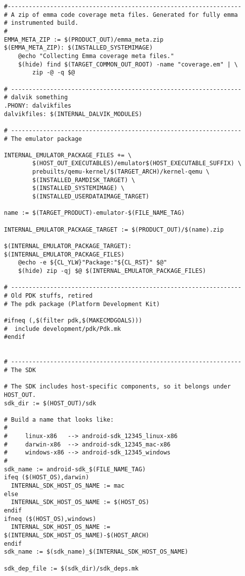 \documentclass[12pt,a4paper]{article}
\begin{document}
\begin{verbatim}
#------------------------------------------------------------------
# A zip of emma code coverage meta files. Generated for fully emma
# instrumented build.
#
EMMA_META_ZIP := $(PRODUCT_OUT)/emma_meta.zip
$(EMMA_META_ZIP): $(INSTALLED_SYSTEMIMAGE)
	@echo "Collecting Emma coverage meta files."
	$(hide) find $(TARGET_COMMON_OUT_ROOT) -name "coverage.em" | \
		zip -@ -q $@

# -----------------------------------------------------------------
# dalvik something
.PHONY: dalvikfiles
dalvikfiles: $(INTERNAL_DALVIK_MODULES)

# -----------------------------------------------------------------
# The emulator package

INTERNAL_EMULATOR_PACKAGE_FILES += \
        $(HOST_OUT_EXECUTABLES)/emulator$(HOST_EXECUTABLE_SUFFIX) \
        prebuilts/qemu-kernel/$(TARGET_ARCH)/kernel-qemu \
        $(INSTALLED_RAMDISK_TARGET) \
		$(INSTALLED_SYSTEMIMAGE) \
		$(INSTALLED_USERDATAIMAGE_TARGET)

name := $(TARGET_PRODUCT)-emulator-$(FILE_NAME_TAG)

INTERNAL_EMULATOR_PACKAGE_TARGET := $(PRODUCT_OUT)/$(name).zip

$(INTERNAL_EMULATOR_PACKAGE_TARGET): $(INTERNAL_EMULATOR_PACKAGE_FILES)
	@echo -e ${CL_YLW}"Package:"${CL_RST}" $@"
	$(hide) zip -qj $@ $(INTERNAL_EMULATOR_PACKAGE_FILES)

# -----------------------------------------------------------------
# Old PDK stuffs, retired
# The pdk package (Platform Development Kit)

#ifneq (,$(filter pdk,$(MAKECMDGOALS)))
#  include development/pdk/Pdk.mk
#endif


# -----------------------------------------------------------------
# The SDK

# The SDK includes host-specific components, so it belongs under HOST_OUT.
sdk_dir := $(HOST_OUT)/sdk

# Build a name that looks like:
#
#     linux-x86   --> android-sdk_12345_linux-x86
#     darwin-x86  --> android-sdk_12345_mac-x86
#     windows-x86 --> android-sdk_12345_windows
#
sdk_name := android-sdk_$(FILE_NAME_TAG)
ifeq ($(HOST_OS),darwin)
  INTERNAL_SDK_HOST_OS_NAME := mac
else
  INTERNAL_SDK_HOST_OS_NAME := $(HOST_OS)
endif
ifneq ($(HOST_OS),windows)
  INTERNAL_SDK_HOST_OS_NAME := $(INTERNAL_SDK_HOST_OS_NAME)-$(HOST_ARCH)
endif
sdk_name := $(sdk_name)_$(INTERNAL_SDK_HOST_OS_NAME)

sdk_dep_file := $(sdk_dir)/sdk_deps.mk


\end{verbatim}
\end{document}
